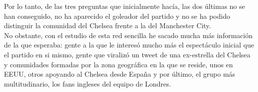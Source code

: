 Por lo tanto, de las tres preguntas que inicialmente hacía, las dos últimas no se han conseguido, no ha aparecido el goleador del partido y no se ha podido distinguir la comunidad del Chelsea frente a la del Manchester City.\\

No obstante, con el estudio de esta red sencilla he sacado mucha más información de la que esperaba: gente a la que le interesó mucho más el espectáculo inicial que el partido en si mismo, gente que viralizó un tweet de una ex-estrella del Chelsea y comunidades formadas por la zona geográfica en la que se reside, unos en EEUU, otros apoyando al Chelsea desde España y por último, el grupo más multitudinario, los fans ingleses del equipo de Londres.
	
	
